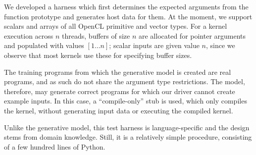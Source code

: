 We developed a harness which first determines the expected arguments from the function prototype and generates host data for them. At the moment, we support scalars and arrays of all OpenCL primitive and vector types. For a kernel execution across $n$ threads, buffers of size $n$ are allocated for pointer arguments and populated with values {$[1 \ldots n]$}; scalar inputs are given value $n$, since we observe that most kernels use these for specifying buffer sizes.

The training programs from which the generative model is created are real programs, and as such do not share the argument type restrictions. The model, therefore, may generate correct programs for which our driver cannot create example inputs. In this case, a ``compile-only'' stub is used, which only compiles the kernel, without generating input data or executing the compiled kernel.

Unlike the generative model, this test harness is language-specific and the design stems from domain knowledge. Still, it is a relatively simple procedure, consisting of a few hundred lines of Python.






